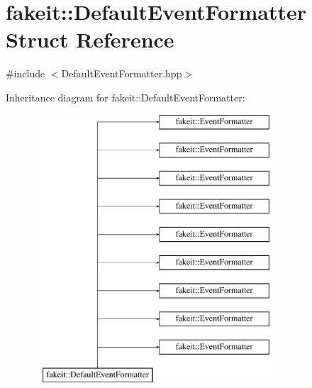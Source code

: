 \hypertarget{structfakeit_1_1DefaultEventFormatter}{}\section{fakeit\+::Default\+Event\+Formatter Struct Reference}
\label{structfakeit_1_1DefaultEventFormatter}


{\ttfamily \#include $<$Default\+Event\+Formatter.\+hpp$>$}

Inheritance diagram for fakeit\+::Default\+Event\+Formatter\+:\begin{figure}[H]
\begin{center}
\leavevmode
\includegraphics[height=10.000000cm]{structfakeit_1_1DefaultEventFormatter}
\end{center}
\end{figure}
